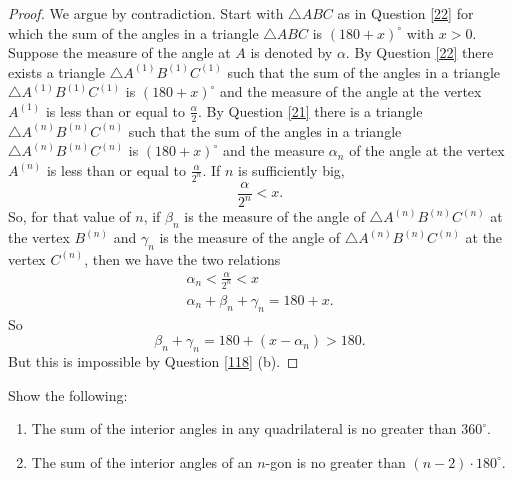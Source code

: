 \documentclass{ximera}
\begin{document}
\begin{proof}
We argue by contradiction. Start with $\triangle ABC$ as in Question \ref{22}
for which the sum of the angles in a triangle $\triangle ABC$ is $\left(
180+x\right)^\circ$ with $x>0$. Suppose the measure of the angle at $A$ is denoted by $\alpha$.
By Question \ref{22} there exists a triangle $\triangle A^{\left(  1\right)
}B^{\left(  1\right)  }C^{\left(  1\right)  }$ such that the sum of the angles
in a triangle $\triangle A^{\left(  1\right)  }B^{\left(  1\right)
}C^{\left(  1\right)  }$ is $\left(  180+x\right)^\circ$ and the measure of the angle at the vertex $A^{\left(  1\right)  }$ is less
than or equal to $\frac{\alpha}{2}$. By Question \ref{21} there is a triangle
$\triangle A^{\left(  n\right)  }B^{\left(  n\right)  }C^{\left(  n\right)  }$
such that the sum of the angles in a triangle $\triangle A^{\left(  n\right)
}B^{\left(  n\right)  }C^{\left(  n\right)  }$ is $\left(  180+x\right)^\circ$ and the measure $\alpha_{n}$ of the angle at the vertex $A^{\left(
n\right)  }$ is less than or equal to $\frac{\alpha}{2^{n}}$. If $n$ is
sufficiently big,%
\[
\frac{\alpha}{2^{n}}<x.
\]
So, for that value of $n$, if $\beta_{n}$ is the measure of the angle of
$\triangle A^{\left(  n\right)  }B^{\left(  n\right)  }C^{\left(  n\right)  }$
at the vertex $B^{\left(  n\right)  }$ and $\gamma_{n}$ is the measure of the
angle of $\triangle A^{\left(  n\right)  }B^{\left(  n\right)  }C^{\left(
n\right)  }$ at the vertex $C^{\left(  n\right)  }$, then we have the two
relations%
\begin{gather*}
\alpha_{n}<\frac{\alpha}{2^{n}}<x\\
\alpha_{n}+\beta_{n}+\gamma_{n}=180+x.
\end{gather*}
So%
\[
\beta_{n}+\gamma_{n}=180+\left(  x-\alpha_{n}\right)  >180.
\]
But this is impossible by Question \ref{118} (b).
\end{proof}

\begin{question}
Show the following:
\begin{enumerate}
\item The sum of the interior angles in any quadrilateral is no greater than $360^\circ$.
\item The sum of the interior angles of an $n$-gon is no greater than
$\left( n-2\right)\cdot180^\circ$.
\end{enumerate}
\end{question}
\end{document}
